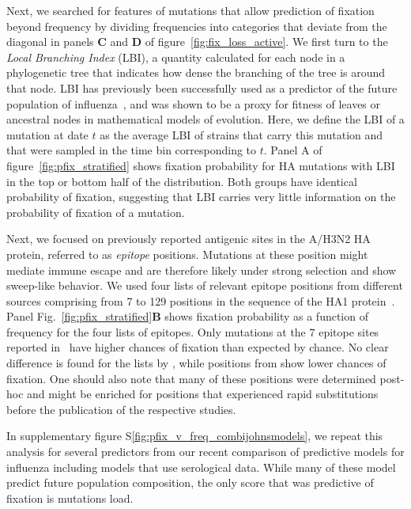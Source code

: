 \documentclass[reprint,amsmath,amssymb,superscriptaddress,showpacs,rmp]{revtex4-1}
\newcommand{\sref}[1]{S\ref{#1}}
\begin{document}
Next, we searched for features of mutations that allow prediction of fixation beyond frequency by dividing frequencies into categories that deviate from the diagonal in panels \textbf{C} and \textbf{D} of figure~\ref{fig:fix_loss_active}.
We first turn to the \emph{Local Branching Index} (LBI), a quantity calculated for each node in a phylogenetic tree that indicates how dense the branching of the tree is around that node.
LBI has previously been successfully used as a predictor of the future population of influenza~\cite{neher_predicting_2014}, and was shown to be a proxy for fitness of leaves or ancestral nodes in mathematical models of evolution.
Here, we define the LBI of a mutation at date $t$ as the average LBI of strains that carry this mutation and that were sampled in the time bin corresponding to $t$.
Panel A of figure~\ref{fig:pfix_stratified} shows fixation probability for HA mutations with LBI in the top or bottom half of the distribution.
Both groups have identical probability of fixation, suggesting that LBI carries very little information on the probability of fixation of a mutation.

Next, we focused on previously reported antigenic sites in the A/H3N2 HA protein, referred to as \emph{epitope} positions.
Mutations at these position might mediate immune escape and are therefore likely under strong selection and show sweep-like behavior.
We used four lists of relevant epitope positions from different sources comprising from 7 to 129 positions in the sequence of the HA1 protein~\cite{Koel976, luksza_predictive_2014, Shih6283, wolf_long_2006}.
Panel Fig.~\ref{fig:pfix_stratified}\textbf{B} shows fixation probability as a function of frequency for the four lists of epitopes.
Only mutations at the 7 epitope sites reported in~\cite{Koel976} have higher chances of fixation than expected by chance.
No clear difference is found for the lists by \citet{luksza_predictive_2014, wolf_long_2006}, while positions from \citet{Shih6283} show lower chances of fixation.
One should also note that many of these positions were determined post-hoc and might be enriched for positions that experienced rapid substitutions before the publication of the respective studies.

In supplementary figure \sref{fig:pfix_v_freq_combijohnsmodels}, we repeat this analysis for several predictors from our recent comparison of predictive models for influenza \citep{huddleston_integrating_2020} including models that use serological data.
While many of these model predict future population composition, the only score that was predictive of fixation is mutations load.
\end{document}

